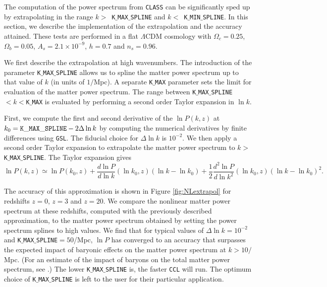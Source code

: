 \documentclass[\docopts]{\docclass}
\newcommand{\ccl}{{\tt CCL}\xspace}
\begin{document}
The computation of the power spectrum from {\tt CLASS} can be significantly sped
up by extrapolating in the range $k>$~{\tt K$\_$MAX$\_$SPLINE} and
$k<$~{\tt K$\_$MIN$\_$SPLINE}. In this section, we describe the implementation of the
extrapolation and the accuracy attained. These tests are performed in a flat
$\Lambda$CDM cosmology with $\Omega_c=0.25$, $\Omega_b=0.05$,
$A_s=2.1\times10^{-9}$, $h=0.7$ and $n_s=0.96$.

We first describe the extrapolation at high wavenumbers. The introduction of
the parameter {\tt K$\_$MAX$\_$SPLINE} allows us to spline the matter power
spectrum up to that value of $k$ (in units of $1/$Mpc). A separate {\tt K$\_$MAX}
parameter sets the limit for evaluation of the matter power spectrum. The range
between {\tt K$\_$MAX$\_$SPLINE}$<k<${\tt K$\_$MAX} is evaluated by performing
a second order Taylor expansion in $\ln k$.

First, we compute the first and second derivative of the $\ln P(k,z)$ at
$k_0={\rm \tt K\_MAX\_SPLINE}-2\Delta\ln k$ by computing the numerical
derivatives by finite differences using {\tt GSL}. The fiducial choice for
$\Delta\ln k$ is $10^{-2}$. We then apply a second order Taylor expansion to
extrapolate the matter power spectrum to $k>${\tt K$\_$MAX$\_$SPLINE}.
The Taylor expansion gives
%
\begin{equation}
  \ln P(k,z) \simeq \ln P(k_0,z) + \frac{d\ln P}{d\ln k}(\ln k_0,z) (\ln k-\ln k_0)  + \frac{1}{2}  \frac{d^2\ln P}{d\ln k^2}(\ln k_0,z) (\ln k-\ln k_0)^2.
  \label{eq:NLPSTaylor}
\end{equation}

The accuracy of this approximation is shown in Figure \ref{fig:NLextrapol} for
redshifts $z=0$, $z=3$ and $z=20$. We compare the nonlinear matter power
spectrum at these redshifts, computed with the previously described approximation,
to the matter power spectrum obtained by setting the power spectrum splines to
high values. We find that for typical values of $\Delta \ln k=10^{-2}$ and
{\tt K$\_$MAX$\_$SPLINE}$=50$/Mpc, $\ln P$ has converged to an accuracy that
surpasses the expected impact of baryonic effects on the matter power spectrum
at $k>10/$Mpc. (For an estimate of the impact of baryons on the total matter
power spectrum, see \citealt{Schneider15}.) The lower {\tt K$\_$MAX$\_$SPLINE}
is, the faster \ccl will run. The optimum choice of {\tt K$\_$MAX$\_$SPLINE} is
left to the user for their particular application.
\end{document}
